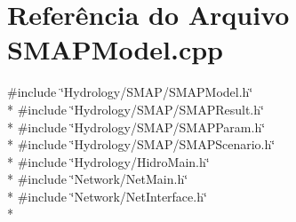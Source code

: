 \section{Referência do Arquivo S\+M\+A\+P\+Model.\+cpp}
\label{_s_m_a_p_model_8cpp}
{\ttfamily \#include \char`\"{}Hydrology/\+S\+M\+A\+P/\+S\+M\+A\+P\+Model.\+h\char`\"{}}\\*
{\ttfamily \#include \char`\"{}Hydrology/\+S\+M\+A\+P/\+S\+M\+A\+P\+Result.\+h\char`\"{}}\\*
{\ttfamily \#include \char`\"{}Hydrology/\+S\+M\+A\+P/\+S\+M\+A\+P\+Param.\+h\char`\"{}}\\*
{\ttfamily \#include \char`\"{}Hydrology/\+S\+M\+A\+P/\+S\+M\+A\+P\+Scenario.\+h\char`\"{}}\\*
{\ttfamily \#include \char`\"{}Hydrology/\+Hidro\+Main.\+h\char`\"{}}\\*
{\ttfamily \#include \char`\"{}Network/\+Net\+Main.\+h\char`\"{}}\\*
{\ttfamily \#include \char`\"{}Network/\+Net\+Interface.\+h\char`\"{}}\\*
